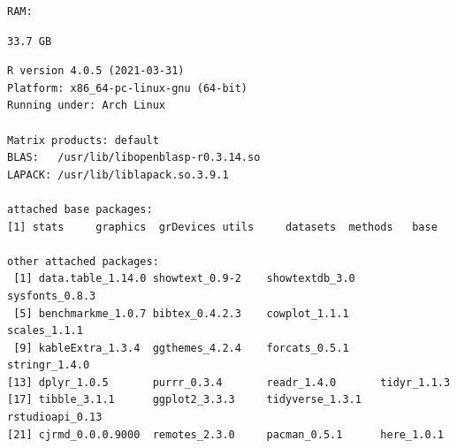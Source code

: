 \documentclass[a4paper, notitlepage]{extreport}
\begin{document}
\begin{verbatim}
RAM:         
\end{verbatim}

\begin{verbatim}
33.7 GB
\end{verbatim}

\begin{verbatim}
R version 4.0.5 (2021-03-31)
Platform: x86_64-pc-linux-gnu (64-bit)
Running under: Arch Linux

Matrix products: default
BLAS:   /usr/lib/libopenblasp-r0.3.14.so
LAPACK: /usr/lib/liblapack.so.3.9.1

attached base packages:
[1] stats     graphics  grDevices utils     datasets  methods   base     

other attached packages:
 [1] data.table_1.14.0 showtext_0.9-2    showtextdb_3.0    sysfonts_0.8.3   
 [5] benchmarkme_1.0.7 bibtex_0.4.2.3    cowplot_1.1.1     scales_1.1.1     
 [9] kableExtra_1.3.4  ggthemes_4.2.4    forcats_0.5.1     stringr_1.4.0    
[13] dplyr_1.0.5       purrr_0.3.4       readr_1.4.0       tidyr_1.1.3      
[17] tibble_3.1.1      ggplot2_3.3.3     tidyverse_1.3.1   rstudioapi_0.13  
[21] cjrmd_0.0.0.9000  remotes_2.3.0     pacman_0.5.1      here_1.0.1       
\end{verbatim}
\end{document}
